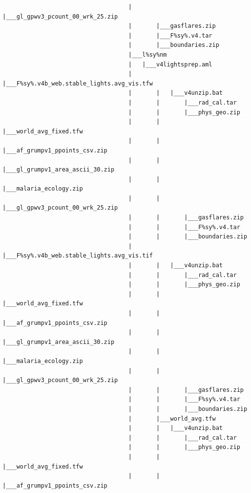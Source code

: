 \documentclass[
]{book}
\begin{document}
\begin{verbatim}
                                    |       |___gl_gpwv3_pcount_00_wrk_25.zip
                                    |       |___gasflares.zip
                                    |       |___F%sy%.v4.tar
                                    |       |___boundaries.zip
                                    |___l%sy%nm
                                    |   |___v4lightsprep.aml
                                    |       |___F%sy%.v4b_web.stable_lights.avg_vis.tfw
                                    |       |   |___v4unzip.bat
                                    |       |       |___rad_cal.tar
                                    |       |       |___phys_geo.zip
                                    |       |       |___world_avg_fixed.tfw
                                    |       |       |___af_grumpv1_ppoints_csv.zip
                                    |       |       |___gl_grumpv1_area_ascii_30.zip
                                    |       |       |___malaria_ecology.zip
                                    |       |       |___gl_gpwv3_pcount_00_wrk_25.zip
                                    |       |       |___gasflares.zip
                                    |       |       |___F%sy%.v4.tar
                                    |       |       |___boundaries.zip
                                    |       |___F%sy%.v4b_web.stable_lights.avg_vis.tif
                                    |       |   |___v4unzip.bat
                                    |       |       |___rad_cal.tar
                                    |       |       |___phys_geo.zip
                                    |       |       |___world_avg_fixed.tfw
                                    |       |       |___af_grumpv1_ppoints_csv.zip
                                    |       |       |___gl_grumpv1_area_ascii_30.zip
                                    |       |       |___malaria_ecology.zip
                                    |       |       |___gl_gpwv3_pcount_00_wrk_25.zip
                                    |       |       |___gasflares.zip
                                    |       |       |___F%sy%.v4.tar
                                    |       |       |___boundaries.zip
                                    |       |___world_avg.tfw
                                    |       |   |___v4unzip.bat
                                    |       |       |___rad_cal.tar
                                    |       |       |___phys_geo.zip
                                    |       |       |___world_avg_fixed.tfw
                                    |       |       |___af_grumpv1_ppoints_csv.zip

\end{verbatim}
\end{document}
